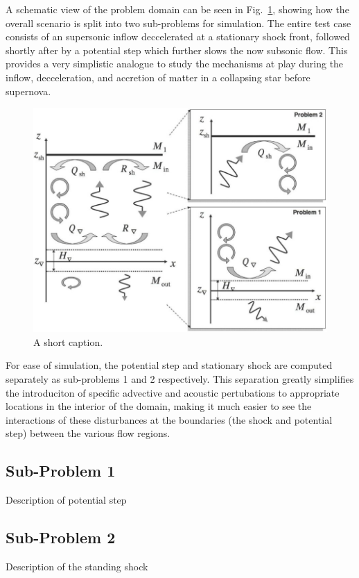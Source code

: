 A schematic view of the problem domain can be seen in Fig.~\ref{fig:Sato1}, showing how the overall scenario is split into two sub-problems for simulation. The entire test case consists of an supersonic inflow deccelerated at a stationary shock front, followed shortly after by a potential step which further slows the now subsonic flow. This provides a very simplistic analogue to study the mechanisms at play during the inflow, decceleration, and accretion of matter in a collapsing star before supernova.

\begin {figure}
\centering
\includegraphics[width=13cm]{figures/Sato1}
\caption {A short caption.}
\label{fig:Sato1}
\end{figure}

For ease of simulation, the potential step and stationary shock are computed separately as sub-problems 1 and 2 respectively. This separation greatly simplifies the introduciton of specific advective and acoustic pertubations to appropriate locations in the interior of the domain, making it much easier to see the interactions of these disturbances at the boundaries (the shock and potential step) between the various flow regions.


\subsection{Sub-Problem 1}

Description of potential step

\subsection{Sub-Problem 2}

Description of the standing shock